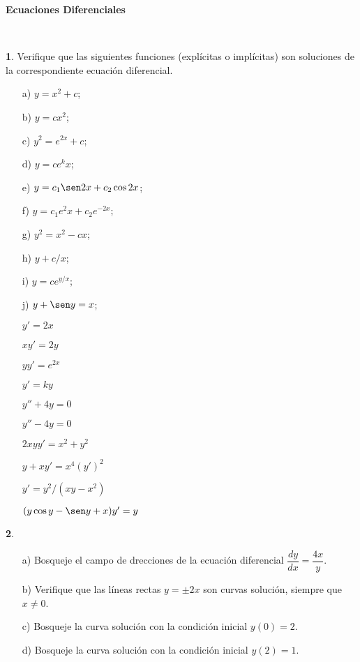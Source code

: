 \documentclass[10pt]{report}
\theoremstyle{definition}
\newtheorem{ej}{}
\begin{document}
\pagestyle{empty}


\begin{center}
\large \textbf{Ecuaciones Diferenciales} 
\end{center}

\

\begin{ej}
Verifique que las siguientes funciones (explícitas o implícitas) son soluciones de la correspondiente ecuación diferencial.

\begin{multicols}{2}
\begin{itemize}
 \item [a)] $y=x^2+c$;
 \item [b)] $y=cx^2$; 
 \item [c)] $y^2=e^{2x}+c$; 
 \item [d)] $y=ce^kx$; 
 \item [e)] $y=c_{1}\sen 2x+c_{2}\cos 2x$; 
 \item [f)] $y=c_{1}e^2x+c_{2}e^{-2x}$; 
 \item [g)] $y^2=x^2-cx$; 
 \item [h)] $y+c/x$; 
 \item [i)] $y=ce^{y/x}$; 
 \item [j)] $y+\sen y=x$; 

\item [] $y'=2x$
\item [] $xy'=2y$
\item [] $yy'=e^{2x}$
\item [] $y'=ky$
\item [] $y''+4y=0$
\item [] $y''-4y=0$
\item [] $2xyy'=x^2+y^2$
\item [] $y+xy'=x^4(y')^2$
\item [] $y'=y^2/(xy-x^2)$
\item [] $(y\cos y-\sen y+x)y'=y$
\end{itemize}
\end{multicols}
\end{ej}

\begin{ej}
\begin{itemize}
 \item  [a)] Bosqueje el campo de drecciones de la ecuación diferencial $\dfrac{dy}{dx}=\dfrac{4x}{y}$. 
 \item [b)] Verifique que las líneas rectas $y=\pm 2x$ son 
 curvas solución, siempre que $x\neq 0$. 
 \item [c)] Bosqueje la curva solución con la condición inicial $y(0)=2$. 
 \item [d)] Bosqueje la curva solución con la  condición inicial $y(2)=1$.
 \end{itemize}
\end{ej}
\end{document}
